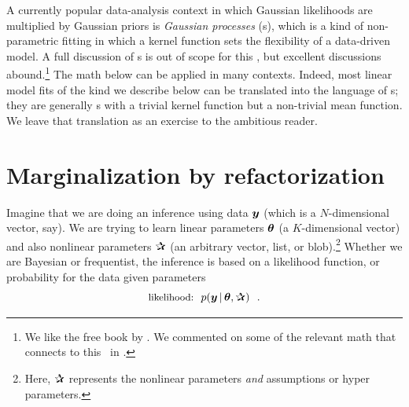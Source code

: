 A currently popular data-analysis context in which Gaussian likelihoods are
multiplied by Gaussian priors is \emph{Gaussian processes} (s),
which is a kind of
non-parametric fitting in which a kernel function sets the flexibility of a
data-driven model. A full discussion of s is out of scope for this
\documentname, but excellent discussions abound.\footnote{We like the free
  book by \cite{Rasmussen:2005}. We commented on some of the relevant math that
  connects to this \documentname\ in \cite{luger}.}
The math below can be applied in many  contexts.
Indeed, most linear model fits of the kind we describe below can be translated
into the language of s;
they are generally s with a trivial kernel function but a non-trivial
mean function. We leave that translation as an exercise to the ambitious reader.

\section{Marginalization by refactorization}

Imagine that we are doing an inference using data $\boldsymbol{y}$ (which is a
$N$-dimensional vector, say).
We are trying to learn linear parameters $\boldsymbol{\theta}$ (a $K$-dimensional vector)
and also nonlinear parameters $\bP$ (an arbitrary vector, list, or
blob).\footnote{Here, $\bP$ represents the nonlinear parameters \emph{and}
assumptions or hyper parameters.}
Whether we are Bayesian or frequentist, the inference is based on
a likelihood function, or probability for the data given parameters
\begin{equation}
\mbox{\small likelihood:} \hquad p(\vy\given\vtheta,\bP) \hquad.
\end{equation}


